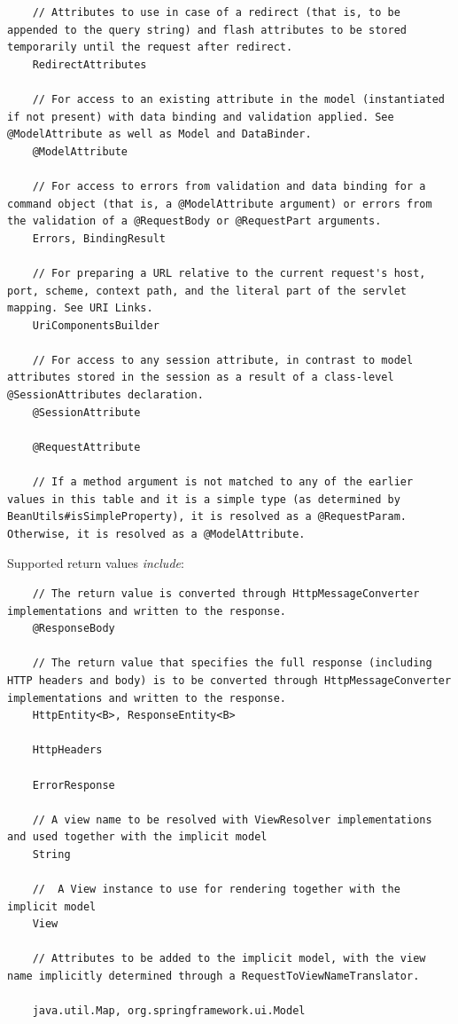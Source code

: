 \documentclass{scrartcl}
\begin{document}
\begin{lstlisting}
    // Attributes to use in case of a redirect (that is, to be appended to the query string) and flash attributes to be stored temporarily until the request after redirect.
    RedirectAttributes

    // For access to an existing attribute in the model (instantiated if not present) with data binding and validation applied. See @ModelAttribute as well as Model and DataBinder.
    @ModelAttribute

    // For access to errors from validation and data binding for a command object (that is, a @ModelAttribute argument) or errors from the validation of a @RequestBody or @RequestPart arguments.
    Errors, BindingResult

    // For preparing a URL relative to the current request's host, port, scheme, context path, and the literal part of the servlet mapping. See URI Links.
    UriComponentsBuilder

    // For access to any session attribute, in contrast to model attributes stored in the session as a result of a class-level @SessionAttributes declaration.
    @SessionAttribute

    @RequestAttribute

    // If a method argument is not matched to any of the earlier values in this table and it is a simple type (as determined by BeanUtils#isSimpleProperty), it is resolved as a @RequestParam. Otherwise, it is resolved as a @ModelAttribute.
    \end{lstlisting}

    Supported return values \textit{include}:

    \begin{lstlisting}
    // The return value is converted through HttpMessageConverter implementations and written to the response.
    @ResponseBody

    // The return value that specifies the full response (including HTTP headers and body) is to be converted through HttpMessageConverter implementations and written to the response.
    HttpEntity<B>, ResponseEntity<B>

    HttpHeaders

    ErrorResponse

    // A view name to be resolved with ViewResolver implementations and used together with the implicit model
    String

    //  A View instance to use for rendering together with the implicit model
    View

    // Attributes to be added to the implicit model, with the view name implicitly determined through a RequestToViewNameTranslator.

    java.util.Map, org.springframework.ui.Model
    \end{lstlisting}
\end{document}

